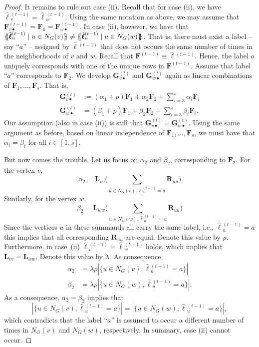 \begin{proof}
It remains to rule out case (ii). Recall that for case (ii), we have $\hat{\pmb{\ell}}{}^{(t-1)}_v=\hat{\pmb{\ell}}{}^{(t-1)}_w$.
Using the same notation as above, we may assume that $\mathbf{F}^{(t-1)}_{v\bullet}=\mathbf{F_1}=\mathbf{F}^{(t-1)}_{w\bullet}$. In case (ii), however, we have that
$
\ldbl \hat{\pmb{\ell}}{}^{(t-1)}_{u} \st u \in N_G(v) \rdbl\neq
\ldbl \hat{\pmb{\ell}}{}^{(t-1)}_{u} \st u \in N_G(w) \rdbl
$.
That is, there must exist a label -- say ``$a$'' -- assigned by $\hat{\pmb{\ell}}{}^{(t-1)}$ that does not occurs the same number of times in the neighborhoods of $v$ and $w$. Recall that $\mathbf{F}^{(t-1)}\equiv \hat{\pmb{\ell}}{}^{(t-1)}$. Hence, the label $a$ uniquely corresponds with one of the unique rows in $\mathbf{F}^{(t-1)}$. Assume that label ``$a$'' corresponds to $\mathbf{F}_2$. We develop $\mathbf{G}^{(t)}_{v\bullet}$ and $\mathbf{G}^{(t)}_{w\bullet}$ again as linear combinations of $\mathbf{F}_1,\ldots,\mathbf{F}_s$. That is,
\begin{align*}
\mathbf{G}^{(t)}_{v\bullet}&:=(\alpha_1+p)\mathbf{F}_1+ \alpha_2\mathbf{F}_2+ \sum_{i=3}^s \alpha_i\mathbf{F}_i\\
\mathbf{G}^{(t)}_{w\bullet}&=(\beta_1+p)\mathbf{F}_1+ \beta_2\mathbf{F}_2+ \sum_{i=3}^s \beta_i\mathbf{F}_i.
\end{align*}
Our assumption (also in case (ii)) is still that $\mathbf{G}^{(t)}_{v\bullet}=\mathbf{G}^{(t)}_{w\bullet}$. Using the same argument as before, based on linear independence of $\mathbf{F}_1,\ldots,\mathbf{F}_s$, we must have that 
$\alpha_i=\beta_i$ for all $i\in [1,s]$.

But now comes the trouble. Let us focus on $\alpha_2$ and $\beta_2$, corresponding to $\mathbf{F}_2$. For the  vertex $v$, 
$$
\alpha_2= \mathbf{L}_{vv}\bigl(\sum_{u\in N_G(v), \hat{\pmb{\ell}}{}^{(t-1)}_u=a}
\mathbf{R}_{uu}\bigr)$$
Similarly, for the vertex $w$,
$$
\beta_2= \mathbf{L}_{ww}\bigl(\sum_{u\in N_G(w), \hat{\pmb{\ell}}{}^{(t-1)}_u=a}
\mathbf{R}_{uu}\bigr)$$
Since the vertices $u$ in these summands all carry the same label, i.e., $\hat{\pmb{\ell}}{}^{(t-1)}_u=a$ this implies that all corresponding $\mathbf{R}_{uu}$ are equal. Denote this value by $\rho$. Furthermore, in case~(ii) $\hat{\pmb{\ell}}{}^{(t-1)}_v=\hat{\pmb{\ell}}{}^{(t-1)}_w$
holds, which implies that $\mathbf{L}_{vv}=\mathbf{L}_{ww}$. Denote this value by $\lambda$. As consequence,
\begin{align*}
\alpha_2&= \lambda\rho|\{u\in N_G(v), \hat{\pmb{\ell}}{}^{(t-1)}_u=a\}|\\
\beta_2&= \lambda\rho|\{u\in N_G(w), \hat{\pmb{\ell}}{}^{(t-1)}_u=a\}|.
\end{align*}
As a consequence, $\alpha_2=\beta_2$ implies that 
$$
|\{u\in N_G(v), \hat{\pmb{\ell}}{}^{(t-1)}_u=a\}|=|\{u\in N_G(w), \hat{\pmb{\ell}}{}^{(t-1)}_u=a\}|,
$$
which contradicts that the label ``$a$'' is assumed to occur a different number of times in $N_G(v)$ and $N_G(w)$, respectively. In summary, case (ii) cannot occur.


\end{proof}
